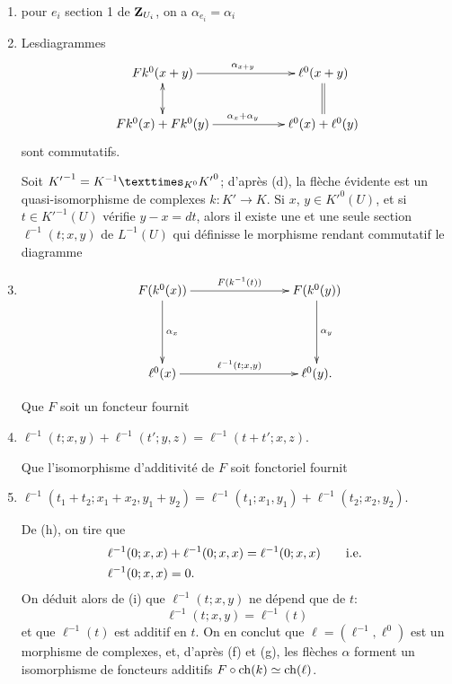 \documentclass[10pt]{../fichiers-configuration-latex/smfart}
\begin{document}
\begin{enumerate}
\item pour $e_{i}$ section 1 de $\mathbf{Z}_{U_{i}}$, on a
$\alpha_{e_{i}}=\alpha_{i}$

\item Les\pageoriginale diagrammes
$$
\xymatrix@C=2cm{
Fk^0(x+y)  \ar[r]^{\alpha_{x+y}} \ar@{<->}[d]& \ell^0(x+y)
\ar@{=}[d]\\
Fk^0(x)+ Fk^0(y)    \ar[r]^{\alpha_{x} + \alpha_{y}}     & \ell^0(x)+\ell^0(y)
}
$$
sont commutatifs.

Soit ${K'}^{-1}=\fprod{K^{-1}}{{K'}^{0}}{K^{0}}$; d'après (d), la
flèche évidente est un quasi-isomorphisme de complexes
$k:K'\rightarrow K$. Si $x$, $y\in {K'}^{0}(U)$, et si $t\in
{K'}^{-1}(U)$ vérifie $y-x=dt$, alors il existe une et une
seule section $\ell^{-1}(t;x,y)$ de $L^{-1}(U)$ qui définisse le
morphisme rendant commutatif le diagramme

\item $\begin{array}[t]{c}
\xymatrix@C=2.75cm@R=1.75cm{
&F(k^0(x))  \ar[r]^{F(k^{-1}(t))} \ar[d]^{\alpha_x}&
  F(k^0(y))\ar[d]^{\alpha_y} \\ 
&\ell^0(x)     \ar[r]^{\ell^{-1}(t;x,y)}& \ell^0(y).
}
\end{array}$


Que $F$ soit un foncteur fournit

\item $\ell^{-1}(t;x,y)+\ell^{-1}(t';y,z)=\ell^{-1}(t+t';x,z)$.

Que l'isomorphisme d'additivité de $F$ soit fonctoriel fournit

\item $\ell^{-1}(t_{1}+t_{2};x_{1}+x_{2},
y_{1}+y_{2})=\ell^{-1}(t_{1};x_{1},y_{1})+\ell^{-1}(t_{2};x_{2},y_{2})$.

De (h), on tire que
\begin{align*}
&\ell^{-1}(0;x,x)+\ell^{-1}(0;x,x)=\ell^{-1}(0;x,x)\qquad \text{{i.e.}\kern.3em}\\
& \ell^{-1}(0;x,x)=0{}.
\end{align*}
On déduit alors de (i) que $\ell^{-1}(t;x,y)$ ne dépend que de $t$:
$$
\ell^{-1}(t;x,y)=\ell^{-1}(t)
$$
et que $\ell^{-1}(t)$ est additif en $t$. On en conclut que
$\ell=(\ell^{-1}, \ell^{0})$ est un morphisme de complexes, et,
d'après (f) et (g), les flèches $\alpha$ forment un isomorphisme de
foncteurs additifs $F\circ \operatorname{ch}(k)\simeq\operatorname{ch}(\ell)$.
\end{enumerate}

\setcounter{subsubsection}{13}
\end{document}
